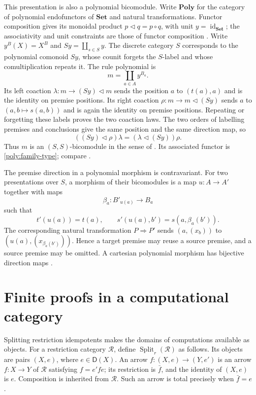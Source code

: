 \documentclass[11pt]{article}
\theoremstyle{definition}
\theoremstyle{remark}
\newcommand{\R}{\mathscr R}
\newcommand{\D}{\mathsf D}
\newcommand{\Set}{\mathbf{Set}}
\newcommand{\id}{\operatorname{id}}
\begin{document}
This presentation is also a polynomial bicomodule. Write $\mathbf{Poly}$
for the category of polynomial endofunctors of $\Set$ and natural
transformations. Functor composition gives its monoidal product
$p\mathbin{\triangleleft}q=p\circ q$, with unit
$y=\id_{\Set}$; the associativity and unit constraints are those of
functor composition \cite[\S6.1.1]{NS2024}. Write $y^B(X)=X^B$ and
$Sy=\coprod_{s\in S}y$. The discrete category $S$ corresponds to the
polynomial comonoid $Sy$, whose counit forgets the
$S$-label and whose comultiplication repeats it. The rule polynomial is
\[
 m=\coprod_{a\in A}y^{B_a}.
\]
Its left coaction $\lambda:m\to(Sy)\triangleleft m$ sends the position
$a$ to $(t(a),a)$ and is the identity on premise positions. Its right
coaction $\rho:m\to m\triangleleft(Sy)$ sends $a$ to
$(a,b\mapsto s(a,b))$ and is again the identity on premise positions.
Repeating or forgetting these labels proves the two coaction laws.
The two orders of labelling premises and conclusions give the same
position and the same direction map, so
\[
 ((Sy)\triangleleft\rho)\lambda
   =(\lambda\triangleleft(Sy))\rho.
\]
Thus $m$ is an $(S,S)$-bicomodule in the sense of
\cite[Definition~8.96]{NS2024}. Its associated functor is
\eqref{poly:family-type}; compare
\cite[Proposition~8.104]{NS2024}.

The premise direction in a polynomial morphism is contravariant.
For two presentations over $S$, a morphism of their bicomodules is a
map $u:A\to A'$ together with maps
\[
 \beta_a:B'_{u(a)}\longrightarrow B_a
\]
such that
\[
 t'(u(a))=t(a),\qquad
 s'(u(a),b')=s(a,\beta_a(b')).
\]
The corresponding natural transformation $P\Rightarrow P'$ sends
$(a,(x_b))$ to $(u(a),(x_{\beta_a(b')}))$. Hence a target premise may
reuse a source premise, and a source premise may be omitted. A
cartesian polynomial morphism has bijective direction maps
\cite[Definition~5.51]{NS2024}.

\section{Finite proofs in a computational category}
\label{poly:computational}

Splitting restriction idempotents makes the domains of computations
available as objects. For a restriction category $\R$, define
$\operatorname{Split}_r(\R)$ as follows. Its objects are pairs $(X,e)$,
where $e\in\D(X)$. An arrow
$f:(X,e)\to(Y,e')$ is an arrow $f:X\to Y$ of $\R$ satisfying
$f=e'fe$; its restriction is $\bar f$, and the identity of $(X,e)$ is
$e$. Composition is inherited from $\R$. Such an arrow is total
precisely when $\bar f=e$.
\end{document}
